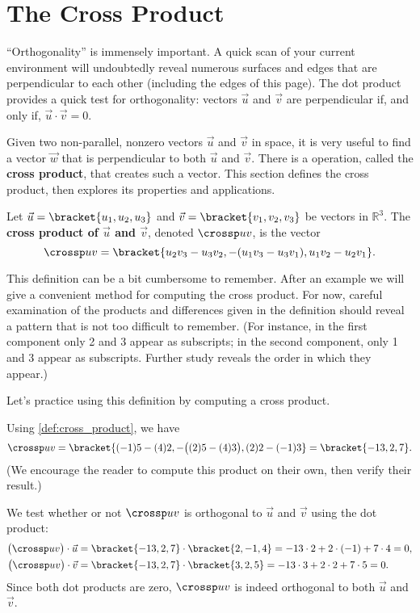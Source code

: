 \section{The Cross Product}\label{sec:cross_product}

``Orthogonality'' is immensely important. A quick scan of your current environment will undoubtedly reveal numerous surfaces and edges that are perpendicular to each other (including the edges of this page). The dot product provides a quick test for orthogonality:  vectors $\vec u$ and $\vec v$ are perpendicular if, and only if, $\vec u\cdot\vec v=0$. 

Given two non-parallel, nonzero vectors $\vec u$ and $\vec v$ in space, it is very useful to find a vector $\vec w$ that is perpendicular to both $\vec u$ and $\vec v$. There is a operation, called the \textbf{cross product}, that creates such a vector. This section defines the cross product, then explores its properties and applications.

\begin{definition}\label{def:cross_product}
Let $\vec u =\bracket{u_1,u_2,u_3}$ and $\vec v = \bracket{v_1,v_2,v_3}$ be vectors in $\mathbb{R}^3$. The \textbf{cross product of $\vec u$ and $\vec v$}, denoted $\crossp uv$, is the vector
\[\crossp uv = \bracket{u_2v_3-u_3v_2,-(u_1v_3-u_3v_1),u_1v_2-u_2v_1}.\]
\end{definition}

This definition can be a bit cumbersome to remember. After an example we will give a convenient method for computing the cross product. For now, careful examination of the products and differences given in the definition should reveal a pattern that is not too difficult to remember. (For instance, in the first component only 2 and 3 appear as subscripts; in the second component, only 1 and 3 appear as subscripts. Further study reveals the order in which they appear.)


Let's practice using this definition by computing a cross product.

{Using \autoref{def:cross_product}, we have
\[
\crossp uv = \bracket{(-1)5-(4)2,-\big((2)5-(4)3\big), (2)2-(-1)3}=\bracket{-13,2,7}.
\] 
(We encourage the reader to compute this product on their own, then verify their result.)

We test whether or not $\crossp uv$ is orthogonal to $\vec u$ and $\vec v$ using the dot product:
\begin{align*}
\big(\crossp uv\big) \cdot \vec u
 &=\bracket{-13,2,7}\cdot\bracket{2,-1,4}=-13\cdot2+2\cdot(-1)+7\cdot4=0, \\
\big(\crossp uv\big) \cdot \vec v
 &=\bracket{-13,2,7}\cdot\bracket{3,2,5}=-13\cdot3+2\cdot2+7\cdot5=0.
\end{align*}
Since both dot products are zero, $\crossp uv$ is indeed orthogonal to both $\vec u$ and $\vec v$.}

